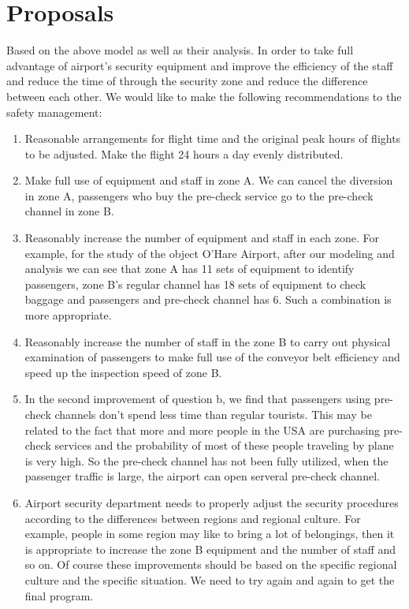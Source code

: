 \section{Proposals}
Based on the above model as well as their analysis. In order to take full advantage of airport's security equipment and improve the efficiency of the staff and reduce the time of through the security zone and reduce the difference between each other. We would like to make the following recommendations to the safety management:
\begin{enumerate}
	\item Reasonable arrangements for flight time and the original peak hours of flights to be adjusted. Make the flight 24 hours a day evenly distributed. 
 	\item Make full use of equipment and staff in zone A. We can cancel the diversion in zone A, passengers who buy the pre-check service go to the pre-check channel in zone B.
 	\item Reasonably increase the number of equipment and staff in each zone. For example, for the study of the object O'Hare Airport, after our modeling and analysis we can see that zone A has 11 sets of equipment to identify passengers, zone B's regular channel has 18 sets of equipment to check baggage and passengers and pre-check channel has 6. Such a combination is more appropriate.
 	\item Reasonably increase the number of staff in the zone B to carry out physical examination of passengers to make full use of the conveyor belt efficiency and speed up the inspection speed of  zone B.
 	\item In the second improvement of question b, we find that passengers using pre-check channels don't spend less time than regular tourists. This may be related to the fact that more and more people in the USA are purchasing pre-check services and the probability of most of these people traveling by plane is very high. So the pre-check channel has not been fully utilized, when the passenger traffic is large, the airport can open serveral pre-check channel.
 	\item Airport security department needs to properly adjust the security procedures according to the differences between regions and regional culture. For example, people in some region may like to bring a lot of belongings, then it is appropriate to increase the zone B equipment and the number of staff and so on. Of course these improvements should be based on the specific regional culture and the specific situation. We need to try again and again to get the final program.
\end{enumerate}

